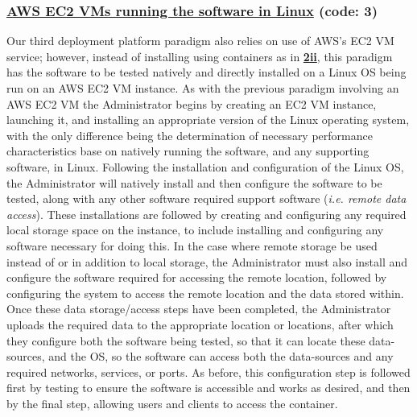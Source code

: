 \documentclass{article}[12pt]
\numberwithin{equation}{section}
\begin{document}
\begin{flushleft}
\subsubsection{\underline{AWS EC2 VMs running the software in Linux} (code: \textbf{3})}
\begin{spacing}{1.5}
	Our third deployment platform paradigm also relies on use of AWS's EC2 VM service; however, instead of installing using containers as in \textbf{\underline{2ii}}, this paradigm has the software to be tested natively and directly installed on a Linux OS being run on an AWS EC2 VM instance.  As with the previous paradigm involving an AWS EC2 VM the Administrator begins by creating an EC2 VM instance, launching it, and installing an appropriate version of the Linux operating system, with the only difference being the determination of necessary performance characteristics base on natively running the software, and any supporting software, in Linux.  Following the installation and configuration of the Linux OS, the Administrator will natively install and then configure the software to be tested, along with any other software required support software (\emph{i.e. remote data access}).  These installations are followed by creating and configuring any required local storage space on the instance, to include installing and configuring any software necessary for doing this.  In the case where remote storage be used instead of or in addition to local storage, the Administrator must also install and configure the software required for accessing the remote location, followed by configuring the system to access the remote location and the data stored within.  Once these data storage/access steps have been completed, the Administrator uploads the required data to the appropriate location or locations, after which they configure both the software being tested, so that it can locate these data-sources, and the OS, so the software can access both the data-sources and any required networks, services, or ports.  As before, this configuration step is followed first by testing to ensure the software is accessible and works as desired, and then by the final step, allowing users and clients to access the container.
\end{spacing}



\end{flushleft}
\end{document}
